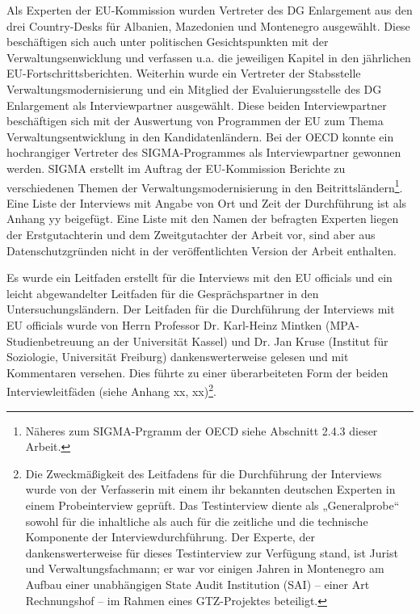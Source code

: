 Als Experten der EU-Kommission wurden Vertreter des DG Enlargement aus den drei Country-Desks für Albanien, Mazedonien und Montenegro ausgewählt. Diese beschäftigen sich auch unter politischen Gesichtspunkten mit der Verwaltungsenwicklung und verfassen u.a. die jeweiligen Kapitel in den jährlichen EU-Fortschrittsberichten. Weiterhin wurde ein Vertreter der Stabsstelle Verwaltungsmodernisierung und ein Mitglied der Evaluierungsstelle des DG Enlargement als Interviewpartner ausgewählt. Diese beiden Interviewpartner beschäftigen sich mit der Auswertung von Programmen der EU zum Thema Verwaltungsentwicklung in den Kandidatenländern. Bei der OECD konnte ein hochrangiger Vertreter des SIGMA-Programmes als Interviewpartner gewonnen werden. SIGMA erstellt im Auftrag der EU-Kommission Berichte zu verschiedenen Themen der Verwaltungsmodernisierung in den Beitrittsländern\footnote{Näheres zum SIGMA-Prgramm der OECD siehe Abschnitt 2.4.3 dieser Arbeit.}. Eine Liste der Interviews mit Angabe von Ort und Zeit der Durchführung ist als Anhang yy beigefügt. Eine Liste mit den Namen der befragten Experten liegen der Erstgutachterin und dem Zweitgutachter der Arbeit vor, sind aber aus Datenschutzgründen nicht in der veröffentlichten Version der Arbeit enthalten.\par
Es wurde ein Leitfaden erstellt für die Interviews mit den EU officials und ein leicht abgewandelter Leitfaden für die Gesprächspartner in den Untersuchungsländern. Der Leitfaden für die Durchführung der Interviews mit EU officials wurde von Herrn Professor Dr. Karl-Heinz Mintken (MPA-Studienbetreuung an der Universität Kassel) und Dr. Jan Kruse (Institut für Soziologie, Universität Freiburg) dankenswerterweise gelesen und mit Kommentaren versehen. Dies führte zu einer überarbeiteten Form der beiden Interviewleitfäden (siehe Anhang xx, xx)\footnote{Die Zweckmäßigkeit des Leitfadens für die Durchführung der Interviews wurde von der Verfasserin mit einem ihr bekannten deutschen Experten in einem Probeinterview geprüft. Das Testinterview diente als „Generalprobe“ sowohl für die inhaltliche als auch für die zeitliche und die technische Komponente der Interviewdurchführung. Der Experte, der dankenswerterweise für dieses Testinterview zur Verfügung stand, ist Jurist und Verwaltungsfachmann; er war vor einigen Jahren in Montenegro am Aufbau einer unabhängigen State Audit Institution (SAI) – einer Art Rechnungshof – im Rahmen eines GTZ-Projektes beteiligt. }.

